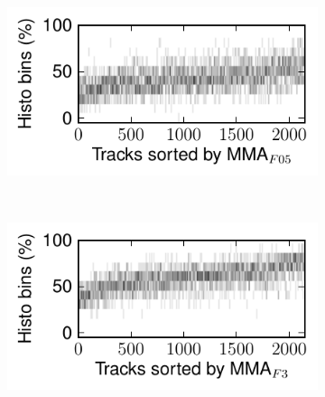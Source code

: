 \documentclass{article}
\begin{document}
\begin{figure}
      \centering
      \begin{subfigure}[b]{0.25\textwidth}
              \includegraphics[width=\textwidth]{plots/histo-F05.pdf}
              \caption{}
              \label{fig:histo-F05}
      \end{subfigure}%
      ~ 
      \begin{subfigure}[b]{0.25\textwidth}
              \includegraphics[width=\textwidth]{plots/histo-F3.pdf}
              \caption{}
              \label{fig:histo-F3}
      \end{subfigure}%
       

\end{figure}
\end{document}
